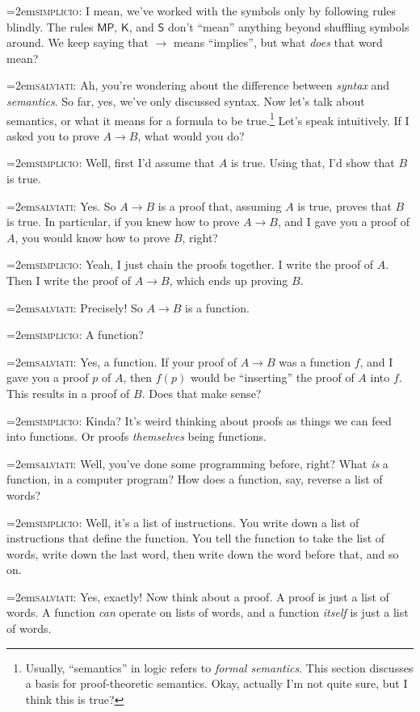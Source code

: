 \documentclass[11pt,paper=letter]{scrartcl}
\renewcommand{\sf}{\mathsf}
\newcommand{\simp}{\vspace{0.5em}\noindent\hangindent=2em\textsc{simplicio:} }
\newcommand{\salv}{\vspace{0.5em}\noindent\hangindent=2em\textsc{salviati:} }
\begin{document}
\simp I mean, we've worked with the symbols only by following rules blindly. The rules $\sf{MP}$, $\sf{K}$, and $\sf{S}$ don't ``mean'' anything beyond shuffling symbols around. We keep saying that $\to$ means ``implies'', but what \emph{does} that word mean?

\salv Ah, you're wondering about the difference between \emph{syntax} and \emph{semantics}. So far, yes, we've only discussed syntax. Now let's talk about semantics, or what it means for a formula to be true.\footnote{Usually, ``semantics'' in logic refers to \emph{formal semantics}. This section discusses a basis for proof-theoretic semantics. Okay, actually I'm not quite sure, but I think this is true?} Let's speak intuitively. If I asked you to prove $A \to B$, what would you do?

\simp Well, first I'd assume that $A$ is true. Using that, I'd show that $B$ is true.

\salv Yes. So $A \to B$ is a proof that, assuming $A$ is true, proves that $B$ is true. In particular, if you knew how to prove $A \to B$, and I gave you a proof of $A$, you would know how to prove $B$, right?

\simp Yeah, I just chain the proofs together. I write the proof of $A$. Then I write the proof of $A \to B$, which ends up proving $B$.

\salv Precisely! So $A \to B$ is a function.

\simp A function?

\salv Yes, a function. If your proof of $A \to B$ was a function $f$, and I gave you a proof $p$ of $A$, then $f(p)$ would be ``inserting'' the proof of $A$ into $f$. This results in a proof of $B$. Does that make sense?

\simp Kinda? It's weird thinking about proofs as things we can feed into functions. Or proofs \emph{themselves} being functions.

\salv Well, you've done some programming before, right? What \emph{is} a function, in a computer program? How does a function, say, reverse a list of words?

\simp Well, it's a list of instructions. You write down a list of instructions that define the function. You tell the function to take the list of words, write down the last word, then write down the word before that, and so on.

\salv Yes, exactly! Now think about a proof. A proof is just a list of words. A function \emph{can} operate on lists of words, and a function \emph{itself} is just a list of words.
\end{document}
